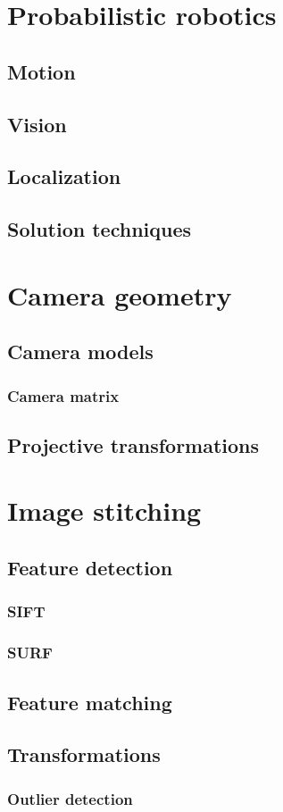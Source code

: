 	\section{Probabilistic robotics}
		\subsection{Motion}
		\subsection{Vision}
		\subsection{Localization}
		\subsection{Solution techniques}

	\section{Camera geometry}
		\subsection{Camera models}
			\subsubsection{Camera matrix}
		\subsection{Projective transformations}
	\section{Image stitching}
		\subsection{Feature detection}
			\subsubsection{SIFT}
			\subsubsection{SURF}
		\subsection{Feature matching}
		\subsection{Transformations}
			\subsubsection{Outlier detection}